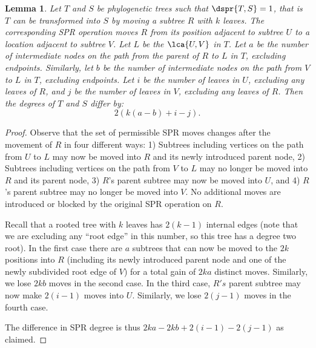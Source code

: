 \documentclass{amsart}
\newtheorem{lemma}[theorem]{Lemma}
\begin{document}
\begin{lemma}
\label{lem:degree_change}
Let $T$ and $S$ be phylogenetic trees such that $\dspr{T,S}=1$, that is $T$ can be transformed into $S$ by moving a subtree $R$ with $k$ leaves.
The corresponding SPR operation moves $R$ from its position adjacent to subtree $U$ to a location adjacent to subtree $V$.
Let $L$ be the $\lca{U,V}$ in $T$.
Let $a$ be the number of intermediate nodes on the path from the parent of $R$ to $L$ in $T$, excluding endpoints.
Similarly, let $b$ be the number of intermediate nodes on the path from $V$ to $L$ in $T$, excluding endpoints.
Let $i$ be the number of leaves in $U$, excluding any leaves of $R$, and $j$ be the number of leaves in $V$, excluding any leaves of $R$.
Then the degrees of $T$ and $S$ differ by:
$$2\left(k(a-b) + i - j\right).$$

\end{lemma}
\begin{proof}

Observe that the set of permissible SPR moves changes after the movement of $R$ in four different ways:
1) Subtrees including vertices on the path from $U$ to $L$ may now be moved into $R$ and its newly introduced parent node,
2) Subtrees including vertices on the path from $V$ to $L$ may no longer be moved into $R$ and its parent node,
3) $R$'s parent subtree may now be moved into $U$, and
4) $R$'s parent subtree may no longer be moved into $V$.
No additional moves are introduced or blocked by the original SPR operation on $R$.

Recall that a rooted tree with $k$ leaves has $2(k-1)$ internal edges (note that we are excluding any ``root edge'' in this number, so this tree has a degree two root).
In the first case there are $a$ subtrees that can now be moved to the $2k$ positions into $R$ (including its newly introduced parent node and one of the newly subdivided root edge of $V$) for a total gain of $2ka$ distinct moves.
Similarly, we lose $2kb$ moves in the second case.
In the third case, $R's$ parent subtree may now make $2(i-1)$ moves into $U$.
Similarly, we lose $2(j-1)$ moves in the fourth case.

The difference in SPR degree is thus $2ka - 2kb + 2(i-1) - 2(j-1)$ as claimed.
\end{proof}
\end{document}
